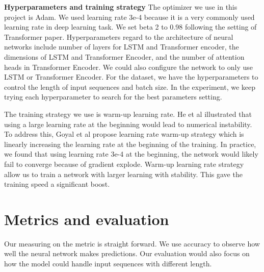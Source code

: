 \noindent\textbf{Hyperparameters and training strategy} \qquad	The optimizer we use in this project is Adam. We used learning rate 3e-4 because it is a very commonly used learning rate in deep learning task. We set beta 2 to 0.98 following the setting of Transformer paper. Hyperparameters regard to the architecture of neural networks include number of layers for LSTM and Transformer encoder, the dimensions of LSTM and Transformer Encoder, and the number of attention heads in Transformer Encoder. We could also configure the network to only use LSTM or Transformer Encoder. For the dataset, we have the hyperparameters to control the length of input sequences and batch size. In the experiment, we keep trying each hyperparameter to search for the best parameters setting.

The training strategy we use is warm-up learning rate. He et al \cite{he2016deep} illustrated that using a large learning rate at the beginning would lead to numerical instability. To address this, Goyal et al \cite{he2019bag} propose learning rate warm-up strategy which is linearly increasing the learning rate at the beginning of the training. In practice, we found that using learning rate 3e-4 at the beginning, the network would likely fail to converge because of gradient explode. Warm-up learning rate strategy allow us to train a network with larger learning with stability. This gave the training speed a significant boost.

\section{Metrics and evaluation}
Our measuring on the metric is straight forward. We use accuracy to observe how well the neural network makes predictions. Our evaluation would also focus on how the model could handle input sequences with different length.